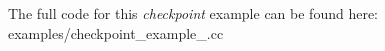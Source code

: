 The full code for this {\itshape checkpoint} example can be found here\+: {\ttfamily examples/checkpoint\+\_\+example\+\_.\+cc}


\begin{DoxyCodeInclude}
\end{DoxyCodeInclude}
